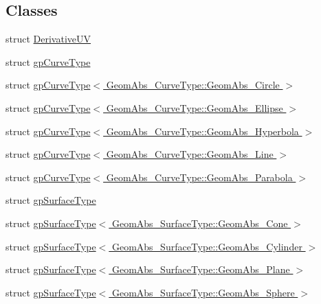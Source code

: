 \subsection*{Classes}
\begin{DoxyCompactItemize}
\item 
struct \hyperlink{structMcCAD_1_1Tools_1_1DerivativeUV}{Derivative\+UV}
\item 
struct \hyperlink{structMcCAD_1_1Tools_1_1gpCurveType}{gp\+Curve\+Type}
\item 
struct \hyperlink{structMcCAD_1_1Tools_1_1gpCurveType_3_01GeomAbs__CurveType_1_1GeomAbs__Circle_01_4}{gp\+Curve\+Type$<$ Geom\+Abs\+\_\+\+Curve\+Type\+::\+Geom\+Abs\+\_\+\+Circle $>$}
\item 
struct \hyperlink{structMcCAD_1_1Tools_1_1gpCurveType_3_01GeomAbs__CurveType_1_1GeomAbs__Ellipse_01_4}{gp\+Curve\+Type$<$ Geom\+Abs\+\_\+\+Curve\+Type\+::\+Geom\+Abs\+\_\+\+Ellipse $>$}
\item 
struct \hyperlink{structMcCAD_1_1Tools_1_1gpCurveType_3_01GeomAbs__CurveType_1_1GeomAbs__Hyperbola_01_4}{gp\+Curve\+Type$<$ Geom\+Abs\+\_\+\+Curve\+Type\+::\+Geom\+Abs\+\_\+\+Hyperbola $>$}
\item 
struct \hyperlink{structMcCAD_1_1Tools_1_1gpCurveType_3_01GeomAbs__CurveType_1_1GeomAbs__Line_01_4}{gp\+Curve\+Type$<$ Geom\+Abs\+\_\+\+Curve\+Type\+::\+Geom\+Abs\+\_\+\+Line $>$}
\item 
struct \hyperlink{structMcCAD_1_1Tools_1_1gpCurveType_3_01GeomAbs__CurveType_1_1GeomAbs__Parabola_01_4}{gp\+Curve\+Type$<$ Geom\+Abs\+\_\+\+Curve\+Type\+::\+Geom\+Abs\+\_\+\+Parabola $>$}
\item 
struct \hyperlink{structMcCAD_1_1Tools_1_1gpSurfaceType}{gp\+Surface\+Type}
\item 
struct \hyperlink{structMcCAD_1_1Tools_1_1gpSurfaceType_3_01GeomAbs__SurfaceType_1_1GeomAbs__Cone_01_4}{gp\+Surface\+Type$<$ Geom\+Abs\+\_\+\+Surface\+Type\+::\+Geom\+Abs\+\_\+\+Cone $>$}
\item 
struct \hyperlink{structMcCAD_1_1Tools_1_1gpSurfaceType_3_01GeomAbs__SurfaceType_1_1GeomAbs__Cylinder_01_4}{gp\+Surface\+Type$<$ Geom\+Abs\+\_\+\+Surface\+Type\+::\+Geom\+Abs\+\_\+\+Cylinder $>$}
\item 
struct \hyperlink{structMcCAD_1_1Tools_1_1gpSurfaceType_3_01GeomAbs__SurfaceType_1_1GeomAbs__Plane_01_4}{gp\+Surface\+Type$<$ Geom\+Abs\+\_\+\+Surface\+Type\+::\+Geom\+Abs\+\_\+\+Plane $>$}
\item 
struct \hyperlink{structMcCAD_1_1Tools_1_1gpSurfaceType_3_01GeomAbs__SurfaceType_1_1GeomAbs__Sphere_01_4}{gp\+Surface\+Type$<$ Geom\+Abs\+\_\+\+Surface\+Type\+::\+Geom\+Abs\+\_\+\+Sphere $>$}

\end{DoxyCompactItemize}
